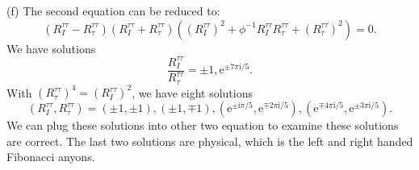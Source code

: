 (f) The second equation can be reduced to:
\begin{equation*}
(R_{I}^{\tau \tau } -R_{\tau }^{\tau \tau } )(R_{I}^{\tau \tau } +R_{\tau }^{\tau \tau } )((R_{I}^{\tau \tau } )^{2} +\phi ^{-1} R_{I}^{\tau \tau } R_{\tau }^{\tau \tau } +(R_{\tau }^{\tau \tau } )^{2} )=0.
\end{equation*}
We have solutions
\begin{equation*}
\frac{R_{I}^{\tau \tau }}{R_{\tau }^{\tau \tau }} =\pm 1,\mathrm{e}^{\pm 7\pi \mathrm{i} /5} .
\end{equation*}
With $(R_{\tau }^{\tau \tau } )^{4} =(R_{I}^{\tau \tau } )^{2}$, we have eight solutions
\begin{equation*}
(R_{I}^{\tau \tau } ,R_{\tau }^{\tau \tau } )=(\pm 1,\pm 1),(\pm 1,\mp 1),(\mathrm{e}^{\pm \mathrm{i} \pi /5} ,\mathrm{e}^{\mp 2\pi \mathrm{i} /5} ),(\mathrm{e}^{\mp 4\pi \mathrm{i} /5} ,\mathrm{e}^{\pm 3\pi \mathrm{i} /5} ).
\end{equation*}
We can plug these solutions into other two equation to examine these solutions are correct. The last two solutions are physical, which is the left and right handed Fibonacci anyons. 

